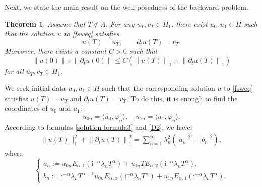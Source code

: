 \documentclass[reqno]{amsart}
\makeatletter
\renewenvironment{proof}[1][\proofname]{\par
  \pushQED{\qed}%
  \normalfont \topsep6\p@\@plus6\p@\relax
  \trivlist
  \item[\hskip\labelsep\bfseries #1\@addpunct{.}]%
}{%
  \popQED\endtrivlist\@endpefalse
}
\newtheorem{theorem}{Theorem}[section]
\numberwithin{equation}{section}
\makeatother
\begin{document}
Next, we state the main result on the well-posedness of the backward problem.
\begin{theorem}
Assume that $T\notin \Lambda$. For any $u_T, v_T \in H_1$, there exist $u_0, u_1 \in H$ such that the solution $u$ to \eqref{fsweq} satisfies
$$
u(T)=u_T, \qquad \partial_t u(T)=v_T.
$$
Moreover, there exists a constant $C>0$ such that
\begin{equation}
\|u(0)\|+\|\partial_t u(0)\| \leq C\left(\left\|u(T)\right\|_{1}+\left\|\partial_t u(T)\right\|_{1}\right)
\end{equation}
for all $u_T, v_T \in H_1$.
\end{theorem}
\begin{proof}
We seek initial data $u_0, u_1 \in H$ such that the corresponding solution $u$ to \eqref{fsweq} satisfies $u(T)=u_T$ and $\partial_t u(T)=v_T.$ To do this, it is enough to find the coordinates of $u_0$ and $u_1$:
$$
u_{0n}=\langle u_0, \varphi_{n}\rangle, \quad u_{1n}=\langle u_1, \varphi_{n}\rangle.
$$
According to formulas \eqref{solution formula3} and \eqref{D2}, we have:
\begin{equation}\label{eq0}
\begin{aligned}
\|u(T)\|_{1}^2+\left\|\partial_t u(T)\right\|_{1}^2
= \sum_{n=1}^{\infty}  \lambda_n^2\left(\left|a_n\right|^2+\left|b_n\right|^2\right),
\end{aligned}
\end{equation}
where 
\begin{equation}\label{sys}
\left\{\begin{array}{l}
a_{n}:=u_{0n} E_{\alpha, 1}\left(\mathrm{i}^{-\alpha}\lambda_n T^\alpha\right)+u_{1n} T E_{\alpha, 2}\left(\mathrm{i}^{-\alpha}\lambda_n T^\alpha\right), \\
b_{n}:=\mathrm{i}^{-\alpha}\lambda_n T^{\alpha-1} u_{0n} E_{\alpha, \alpha}\left(\mathrm{i}^{-\alpha}\lambda_n T^\alpha\right)+u_{1n} E_{\alpha, 1}\left(\mathrm{i}^{-\alpha}\lambda_n T^\alpha\right).
\end{array}\right.
\end{equation}

\end{proof}
\end{document}
